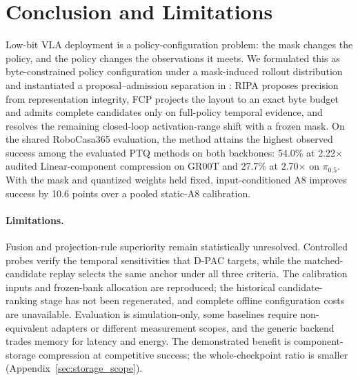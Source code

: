 \section{Conclusion and Limitations}
\label{sec:conclusion}

Low-bit VLA deployment is a policy-configuration problem: the mask changes the policy, and the policy changes the observations it meets. We formulated this as byte-constrained policy configuration under a mask-induced rollout distribution and instantiated a proposal--admission separation in \method: RIPA proposes precision from representation integrity, FCP projects the layout to an exact byte budget and admits complete candidates only on full-policy temporal evidence, and \dyrange resolves the remaining closed-loop activation-range shift with a frozen mask. On the shared RoboCasa365 evaluation, the method attains the highest observed success among the evaluated PTQ methods on both backbones: 54.0\% at 2.22$\times$ audited Linear-component compression on GR00T and 27.7\% at 2.70$\times$ on $\pi_{0.5}$. With the mask and quantized weights held fixed, input-conditioned A8 improves success by 10.6 points over a pooled static-A8 calibration.

\paragraph{Limitations.}
Fusion and projection-rule superiority remain statistically unresolved. Controlled probes verify the temporal sensitivities that D-PAC targets, while the matched-candidate replay selects the same anchor under all three criteria. The calibration inputs and frozen-bank allocation are reproduced; the historical candidate-ranking stage has not been regenerated, and complete offline configuration costs are unavailable. Evaluation is simulation-only, some baselines require non-equivalent adapters or different measurement scopes, and the generic backend trades memory for latency and energy. The demonstrated benefit is component-storage compression at competitive success; the whole-checkpoint ratio is smaller (Appendix~\ref{sec:storage_scope}).
\label{sec:main-paper-end}

